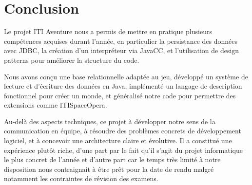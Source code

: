 \chapter{Conclusion}

Le projet ITI Aventure nous a permis de mettre en pratique plusieurs compétences acquises durant l’année, en particulier la persistance des données avec JDBC, la création d’un interpréteur via JavaCC, et l’utilisation de design patterns pour améliorer la structure du code.

Nous avons conçu une base relationnelle adaptée au jeu, développé un système de lecture et d’écriture des données en Java, implémenté un langage de description fonctionnel pour créer un monde, et généralisé notre code pour permettre des extensions comme ITISpaceOpera.

Au-delà des aspects techniques, ce projet à développer notre sens de la communication en équipe, à résoudre des problèmes concrets de développement logiciel, et à concevoir une architecture claire et évolutive. Il a constitué une expérience plutôt riche, d'une part par le fait qu'il s'agit du projet informatique le plus concret de l'année et d'autre part car le temps très limité à notre disposition nous contraignait à être prêt pour la date de rendu malgré notamment les contraintes de révision des examens.